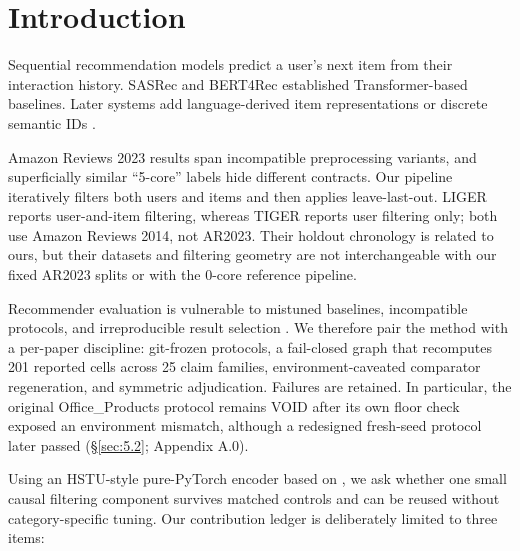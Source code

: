 \section{Introduction}\label{sec:1}

Sequential recommendation models predict a user's next item from their interaction
history. SASRec \citep{kang2018sasrec} and BERT4Rec \citep{sun2019bert4rec}
established Transformer-based baselines. Later systems add language-derived item
representations \citep{ding2021zesrec,hou2022unisrec,li2023recformer,hou2024blair}
or discrete semantic IDs \citep{rajput2023tiger,yang2024liger}.

Amazon Reviews 2023 results span incompatible preprocessing variants, and superficially
similar ``5-core'' labels hide different contracts. Our pipeline iteratively filters
both users and items and then applies leave-last-out. LIGER reports user-and-item
filtering, whereas TIGER reports user filtering only; both use Amazon Reviews 2014,
not AR2023. Their holdout chronology is related to ours, but their datasets and
filtering geometry are not interchangeable with our fixed AR2023 splits or with the
0-core reference pipeline.

Recommender evaluation is vulnerable to mistuned baselines, incompatible protocols,
and irreproducible result selection
\citep{ferraridacrema2019worrying,ferraridacrema2021troubling}. We therefore pair
the method with a per-paper discipline: git-frozen protocols, a fail-closed graph that
recomputes 201 reported cells across 25 claim families, environment-caveated comparator
regeneration, and symmetric adjudication. Failures are retained. In particular, the
original Office\_Products protocol remains VOID after its own floor check exposed an
environment mismatch, although a redesigned fresh-seed protocol later passed
(\S\ref{sec:5.2}; Appendix A.0).

Using an HSTU-style pure-PyTorch encoder based on \citet{zhai2024hstu}, we ask whether
one small causal filtering component survives matched controls and can be reused without
category-specific tuning. Our contribution ledger is deliberately limited to three
items:

